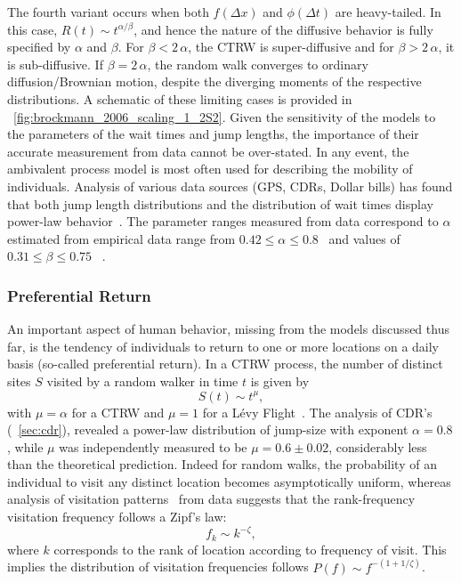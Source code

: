  The fourth variant occurs when both $f(\Delta x)$ and $\phi(\Delta t)$ are heavy-tailed. In this case, $R(t) \sim t^{\alpha/\beta}$, and hence the nature of the diffusive behavior is fully specified by $\alpha$ and $\beta$. For $\beta < 2\, \alpha$, the CTRW is super-diffusive and for $\beta > 2\, \alpha$, it is sub-diffusive. If $\beta = 2\, \alpha$, the random walk converges to ordinary diffusion/Brownian motion, despite the diverging moments of the respective distributions. A schematic of these limiting cases is provided in \figurename~\ref{fig:brockmann_2006_scaling_1_2S2}. Given the sensitivity of the models to the parameters of the wait times and jump lengths, the importance of their accurate measurement from data cannot be over-stated. In any event, the ambivalent process model is most often used for describing the mobility of individuals. Analysis of various data sources (GPS, CDRs, Dollar bills) has found that both jump length distributions and the distribution of wait times display power-law behavior~\cite{brockmann_2006_scaling, gonzalez_2008_understanding, zhao_2008_empirical, song_2010_modelling}. The parameter ranges measured from data correspond to $\alpha$ estimated from empirical data range from $0.42 \leq \alpha \leq 0.8$~\cite{zhao_2008_empirical,song_2010_modelling} and values of $0.31 \leq \beta \leq 0.75$ ~\cite{zhao_2008_empirical,gonzalez_2008_understanding}.


\subsubsection{Preferential Return}
\label{sec:epr}

An important aspect of human behavior, missing from the models discussed thus far, is the tendency of individuals to return to one or more locations on a daily basis (so-called preferential return). In a CTRW process, the number of distinct sites $S$ visited by a random walker in time $t$ is given by
\begin{equation}
S(t) \sim t^{\mu} ,
\label{individual:17}
\end{equation}
with $\mu = \alpha$ for a CTRW and $\mu =1$ for a L\'evy Flight~\cite{gillis_1970_expected}. The analysis of CDR's (\sectionname~\ref{sec:cdr}), revealed a power-law distribution of jump-size with exponent $\alpha = 0.8$, while $\mu$ was independently measured to be $\mu = 0.6 \pm 0.02$, considerably less than the theoretical prediction. Indeed for random walks, the probability of an individual to visit any distinct location becomes asymptotically uniform, whereas  analysis of visitation patterns~\cite{gonzalez_2008_understanding} from data suggests that the rank-frequency visitation frequency follows a Zipf's law: 
\begin{equation}
f_{k} \sim k^{-\zeta}, 
\label{individual:18}
\end{equation}
where $k$ corresponds to the rank of location according to frequency of visit. This implies the distribution of visitation frequencies follows $P(f) \sim f^{-(1+1/\zeta)}$.

